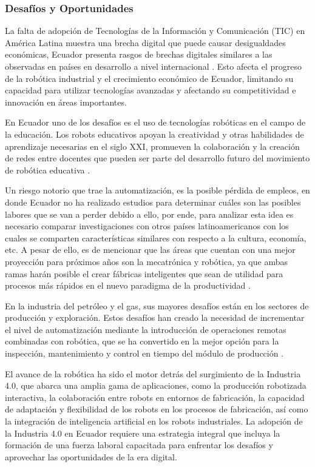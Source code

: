 \documentclass[conference]{IEEEtran}
\begin{document}
\subsubsection{Desafíos y Oportunidades}

La falta de adopción de Tecnologías de la Información y Comunicación (TIC) en América Latina muestra una brecha digital que puede causar desigualdades económicas, Ecuador presenta rasgos de brechas digitales similares a las observadas en países en desarrollo a nivel internacional \cite{Hector2015} . Esto afecta el progreso de la robótica industrial y el crecimiento económico de Ecuador, limitando su capacidad para utilizar tecnologías avanzadas y afectando su competitividad e innovación en áreas importantes.

En Ecuador uno de los desafíos es el uso de tecnologías robóticas en el campo de la educación. Los robots educativos apoyan la creatividad y otras habilidades de aprendizaje necesarias en el siglo XXI, promueven la colaboración y la creación de redes entre docentes que pueden ser parte del desarrollo futuro del movimiento de robótica educativa \cite{Galindo2021}.

Un riesgo notorio que trae la automatización, es la posible pérdida de empleos, en donde Ecuador no ha realizado estudios para determinar cuáles son las posibles labores que se van a perder debido a ello, por ende, para analizar esta idea es necesario comparar investigaciones con otros países latinoamericanos con los cuales se comparten características similares con respecto a la cultura, economía, etc. A pesar de ello, es de mencionar que las áreas que cuentan con una mejor proyección para próximos años son la mecatrónica y robótica, ya que ambas ramas harán posible el crear fábricas inteligentes que sean de utilidad para procesos más rápidos en el nuevo paradigma de la productividad \cite{Marcel2019}.

En la industria del petróleo y el gas, sus mayores desafíos están en los sectores de producción y exploración. Estos desafíos han creado la necesidad de incrementar el nivel de automatización mediante la introducción de operaciones remotas combinadas con robótica, que se ha convertido en la mejor opción para la inspección, mantenimiento y control en tiempo del módulo de producción \cite{Naranjo2018}.

El avance de la robótica ha sido el motor detrás del surgimiento de la Industria 4.0, que abarca una amplia gama de aplicaciones, como la producción robotizada interactiva, la colaboración entre robots en entornos de fabricación, la capacidad de adaptación y flexibilidad de los robots en los procesos de fabricación, así como la integración de inteligencia artificial en los robots industriales\cite{Bahrin2016}. La adopción de la Industria 4.0 en Ecuador requiere una estrategia integral que incluya la formación de una fuerza laboral capacitada para enfrentar los desafíos y aprovechar las oportunidades de la era digital.
\end{document}
